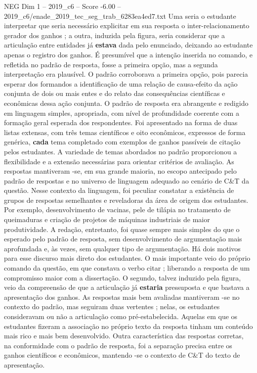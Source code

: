 \begin{textsample}{NEG Dim 1 – 2019\_c6 – Score -6.00 – 2019\_c6/enade\_2019\_tec\_seg\_trab\_6283ea4ed7.txt}
Uma seria o estudante interpretar que seria necessário explicitar em sua resposta o inter-relacionamento gerador dos ganhos ; a outra, induzida pela figura, seria considerar que a articulação entre entidades já \textbf{estava} dada pelo enunciado, deixando ao estudante apenas o registro dos ganhos.
É presumível que a intenção inserida no comando, e refletida no padrão de resposta, fosse a primeira opção, mas a segunda interpretação era plausível.
O padrão corroborava a primeira opção, pois parecia esperar dos formandos a identificação de uma relação de causa-efeito da ação conjunta de dois ou mais entes e do relato das consequências científicas e econômicas dessa ação conjunta.
O padrão de resposta era abrangente e redigido em linguagem simples, apropriada, com nível de profundidade coerente com a formação geral esperada dos respondentes.
Foi apresentado na forma de duas listas extensas, com três temas científicos e oito econômicos, expressos de forma genérica, \textbf{cada} tema completado com exemplos de ganhos passíveis de citação pelos estudantes.
A variedade de temas abordados no padrão proporcionou a flexibilidade e a extensão necessárias para orientar critérios de avaliação.
As respostas mantiveram -se, em sua grande maioria, no escopo antecipado pelo padrão de respostas e no universo de linguagem adequado ao cenário de C\&T da questão.
Nesse contexto da linguagem, foi peculiar constatar a existência de grupos de respostas semelhantes e reveladoras da área de origem dos estudantes.
Por exemplo, desenvolvimento de vacinas, pele de tilápia no tratamento de queimaduras e criação de projetos de máquinas industriais de maior produtividade.
A redação, entretanto, foi quase sempre mais simples do que o esperado pelo padrão de resposta, sem desenvolvimento de argumentação mais aprofundada e, às vezes, sem qualquer tipo de argumentação.
Há dois motivos para esse discurso mais direto dos estudantes.
O mais importante veio do próprio comando da questão, em que constava o verbo citar ; liberando a resposta de um compromisso maior com a dissertação.
O segundo, talvez induzido pela figura, veio da compreensão de que a articulação já \textbf{estaria} pressuposta e que bastava a apresentação dos ganhos.
As respostas mais bem avaliadas mantiveram -se no contexto do padrão, mas seguiram duas vertentes ; nelas, os estudantes consideravam ou não a articulação como pré-estabelecida.
Aquelas em que os estudantes fizeram a associação no próprio texto da resposta tinham um conteúdo mais rico e mais bem desenvolvido.
Outra característica das respostas corretas, na conformidade com o padrão de resposta, foi a separação precisa entre os ganhos científicos e econômicos, mantendo -se o contexto de C\&T do texto de apresentação.

\end{textsample}

